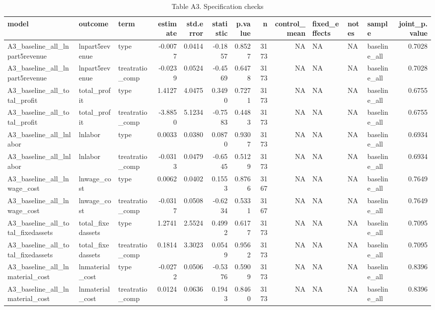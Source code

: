 \begin{table}

\caption{Table A3. Specification checks}
\centering
\begin{tabular}[t]{lllrrrrrrlllr}
\toprule
model & outcome & term & estimate & std.error & statistic & p.value & n & control\_mean & fixed\_effects & notes & sample & joint\_p.value\\
\midrule
A3\_baseline\_all\_lnpart5revenue & lnpart5revenue & type & -0.0077 & 0.0414 & -0.1857 & 0.8527 & 3173 & NA & NA & NA & baseline\_all & 0.7028\\
A3\_baseline\_all\_lnpart5revenue & lnpart5revenue & treatratio\_comp & -0.0239 & 0.0524 & -0.4569 & 0.6478 & 3173 & NA & NA & NA & baseline\_all & 0.7028\\
A3\_baseline\_all\_total\_profit & total\_profit & type & 1.4127 & 4.0475 & 0.3490 & 0.7271 & 3173 & NA & NA & NA & baseline\_all & 0.6755\\
A3\_baseline\_all\_total\_profit & total\_profit & treatratio\_comp & -3.8850 & 5.1234 & -0.7583 & 0.4483 & 3173 & NA & NA & NA & baseline\_all & 0.6755\\
A3\_baseline\_all\_lnlabor & lnlabor & type & 0.0033 & 0.0380 & 0.0870 & 0.9307 & 3173 & NA & NA & NA & baseline\_all & 0.6934\\
\addlinespace
A3\_baseline\_all\_lnlabor & lnlabor & treatratio\_comp & -0.0313 & 0.0479 & -0.6545 & 0.5129 & 3173 & NA & NA & NA & baseline\_all & 0.6934\\
A3\_baseline\_all\_lnwage\_cost & lnwage\_cost & type & 0.0062 & 0.0402 & 0.1553 & 0.8766 & 3167 & NA & NA & NA & baseline\_all & 0.7649\\
A3\_baseline\_all\_lnwage\_cost & lnwage\_cost & treatratio\_comp & -0.0317 & 0.0508 & -0.6234 & 0.5331 & 3167 & NA & NA & NA & baseline\_all & 0.7649\\
A3\_baseline\_all\_total\_fixedassets & total\_fixedassets & type & 1.2741 & 2.5524 & 0.4992 & 0.6177 & 3173 & NA & NA & NA & baseline\_all & 0.7095\\
A3\_baseline\_all\_total\_fixedassets & total\_fixedassets & treatratio\_comp & 0.1814 & 3.3023 & 0.0549 & 0.9562 & 3173 & NA & NA & NA & baseline\_all & 0.7095\\
\addlinespace
A3\_baseline\_all\_lnmaterial\_cost & lnmaterial\_cost & type & -0.0272 & 0.0506 & -0.5376 & 0.5909 & 3173 & NA & NA & NA & baseline\_all & 0.8396\\
A3\_baseline\_all\_lnmaterial\_cost & lnmaterial\_cost & treatratio\_comp & 0.0124 & 0.0636 & 0.1943 & 0.8460 & 3173 & NA & NA & NA & baseline\_all & 0.8396\\

\end{tabular}
\end{table}
